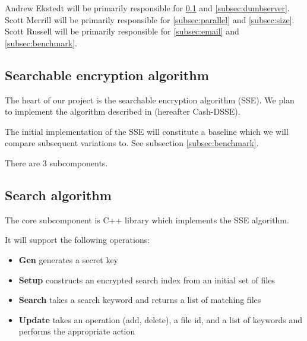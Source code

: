 Andrew Ekstedt will be primarily responsible for \ref{subsec:sse} and \ref{subsec:dumbserver}.
Scott Merrill will be primarily responsible for \ref{subsec:parallel} and \ref{subsec:size}.
Scott Russell will be primarily responsible for \ref{subsec:email} and \ref{subsec:benchmark}.

\subsection{ Searchable encryption algorithm }
\label{subsec:sse}




The heart of our project is the searchable encryption algorithm (SSE).
We plan to implement the algorithm described in \cite{cash14} (hereafter Cash-DSSE).

The initial implementation of the SSE will constitute a baseline which we will compare subsequent variations to. 
See subsection \ref{subsec:benchmark}.


There are 3 subcomponents.

\subsection{ Search algorithm }

The core subcomponent is C++ library which implements the SSE algorithm. 

It will support the following operations:
\begin{itemize}
\item \textbf{Gen} generates a secret key
\item \textbf{Setup} constructs an encrypted search index from an initial set of files
\item \textbf{Search} takes a search keyword and returns a list of matching files
\item \textbf{Update} takes an operation (add, delete), a file id, and a list of keywords and performs the appropriate action
\end{itemize}

